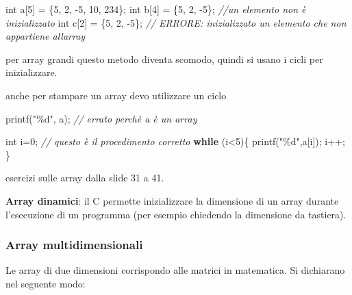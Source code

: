 \documentclass[
]{article}
\newenvironment{Shaded}{}{}
\newcommand{\CommentTok}[1]{\textcolor[rgb]{0.38,0.63,0.69}{\textit{#1}}}
\newcommand{\ControlFlowTok}[1]{\textcolor[rgb]{0.00,0.44,0.13}{\textbf{#1}}}
\newcommand{\DataTypeTok}[1]{\textcolor[rgb]{0.56,0.13,0.00}{#1}}
\newcommand{\DecValTok}[1]{\textcolor[rgb]{0.25,0.63,0.44}{#1}}
\newcommand{\NormalTok}[1]{#1}
\newcommand{\SpecialCharTok}[1]{\textcolor[rgb]{0.25,0.44,0.63}{#1}}
\newcommand{\StringTok}[1]{\textcolor[rgb]{0.25,0.44,0.63}{#1}}
\begin{document}
\begin{Shaded}
\begin{Highlighting}[]
\DataTypeTok{int}\NormalTok{ a[}\DecValTok{5}\NormalTok{] = \{}\DecValTok{5}\NormalTok{, }\DecValTok{2}\NormalTok{, {-}}\DecValTok{5}\NormalTok{, }\DecValTok{10}\NormalTok{, }\DecValTok{234}\NormalTok{\};}
\DataTypeTok{int}\NormalTok{ b[}\DecValTok{4}\NormalTok{] = \{}\DecValTok{5}\NormalTok{, }\DecValTok{2}\NormalTok{, {-}}\DecValTok{5}\NormalTok{\}; }\CommentTok{//un elemento non è inizializzato}
\DataTypeTok{int}\NormalTok{ c[}\DecValTok{2}\NormalTok{] = \{}\DecValTok{5}\NormalTok{, }\DecValTok{2}\NormalTok{, {-}}\DecValTok{5}\NormalTok{\}; }\CommentTok{// ERRORE: inizializzato un elemento che non appartiene all\textquotesingle{}array}
\end{Highlighting}
\end{Shaded}

per array grandi questo metodo diventa scomodo, quindi si usano i cicli
per inizializzare.

anche per stampare un array devo utilizzare un ciclo

\begin{Shaded}
\begin{Highlighting}[]
\NormalTok{printf(}\StringTok{"}\SpecialCharTok{\%d}\StringTok{"}\NormalTok{, a); }\CommentTok{// errato perchè a è un array}

\DataTypeTok{int}\NormalTok{ i=}\DecValTok{0}\NormalTok{; }\CommentTok{// questo è il procedimento corretto}
\ControlFlowTok{while}\NormalTok{ (i\textless{}}\DecValTok{5}\NormalTok{)\{}
\NormalTok{    printf(}\StringTok{"}\SpecialCharTok{\%d}\StringTok{"}\NormalTok{,a[i]);}
\NormalTok{    i++;}
\NormalTok{\} }
\end{Highlighting}
\end{Shaded}

esercizi sulle array dalla slide 31 a 41.

\textbf{Array dinamici}: il C permette inizializzare la dimensione di un
array durante l'esecuzione di un programma (per esempio chiedendo la
dimensione da tastiera).

\hypertarget{header-n451}{%
\subsubsection{Array multidimensionali}\label{header-n451}}

Le array di due dimensioni corrispondo alle matrici in matematica. Si
dichiarano nel seguente modo:
\end{document}
